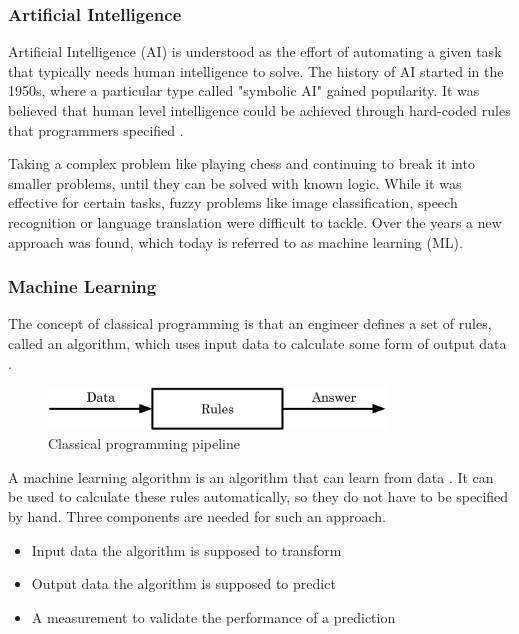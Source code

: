 \subsubsection{Artificial Intelligence}

Artificial Intelligence (AI) is understood as the effort of automating a given task that typically needs human intelligence to solve. The history of AI started in the 1950s, where a particular type called "symbolic AI" gained popularity. It was believed that human level intelligence could be achieved through hard-coded rules that programmers specified \cite{Chollet2017}. 

Taking a complex problem like playing chess and continuing to break it into smaller problems, until they can be solved with known logic. While it was effective for certain tasks, fuzzy problems like image classification, speech recognition or language translation were difficult to tackle. Over the years a new approach was found, which today is referred to as machine learning (ML).

\subsubsection{Machine Learning}

The concept of classical programming is that an engineer defines a set of rules, called an algorithm, which uses input data to calculate some form of output data \cite{Chollet2017}.

\begin{figure}[H]
\centering
\par
\includegraphics[width=0.8\textwidth]{imgs/classic_prog.png}
\caption{Classical programming pipeline}
\par
\end{figure}

A machine learning algorithm is an algorithm that can learn from data \cite{Goodfellow2016}. It can be used to calculate these rules automatically, so they do not have to be specified by hand. Three components are needed for such an approach.

\begin{itemize}
\item Input data the algorithm is supposed to transform
\item Output data the algorithm is supposed to predict
\item A measurement to validate the performance of a prediction
\end{itemize}

